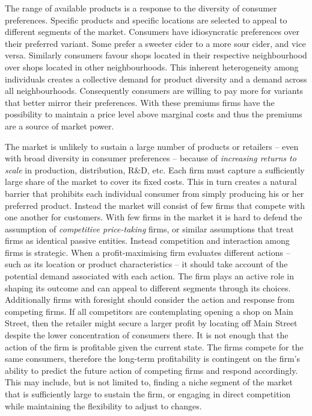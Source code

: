 \documentclass[preprint, 12pt]{elsarticle}
\begin{document}
The range of available products is a response to the diversity of consumer preferences. Specific products and specific locations are selected to appeal to different segments of the market. Consumers have idiosyncratic preferences over their preferred variant. Some prefer a sweeter cider to a more sour cider, and vice versa. Similarly consumers favour shops located in their respective neighbourhood over shops located in other neighbourhoods. This inherent heterogeneity among individuals creates a collective demand for product diversity and a demand across all neighbourhoods. Consequently consumers are willing to pay more for variants that better mirror their preferences. With these premiums firms have the possibility to maintain a price level above marginal costs and thus the premiums are a source of market power.

The market is unlikely to sustain a large number of products or retailers -- even with broad diversity in consumer preferences -- because of \emph{increasing returns to scale} in production, distribution, R\&D, etc. Each firm must capture a sufficiently large share of the market to cover its fixed costs. This in turn creates a natural barrier that prohibits each individual consumer from simply producing his or her preferred product. Instead the market will consist of few firms that compete with one another for customers. With few firms in the market it is hard to defend the assumption of \emph{competitive price-taking} firms, or similar assumptions that treat firms as identical passive entities. Instead competition and interaction among firms is strategic. When a profit-maximising firm evaluates different actions -- such as its location or product characteristics -- it should take account of the potential demand associated with each action. The firm plays an active role in shaping its outcome and can appeal to different segments through its choices. Additionally firms with foresight should consider the action and response from competing firms. If all competitors are contemplating opening a shop on Main Street, then the retailer might secure a larger profit by locating off Main Street despite the lower concentration of consumers there. It is not enough that the action of the firm is profitable given the current state. The firms compete for the same consumers, therefore the long-term profitability is contingent on the firm's ability to predict the future action of competing firms and respond accordingly. This may include, but is not limited to, finding a niche segment of the market that is sufficiently large to sustain the firm, or engaging in direct competition while maintaining the flexibility to adjust to changes.
\end{document}
